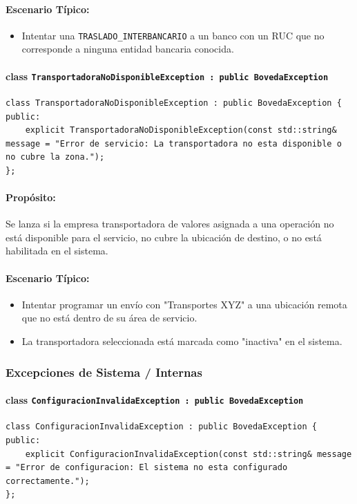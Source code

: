 \documentclass{article}
\newcommand{\inlinecode}[1]{\texttt{#1}}
\begin{document}
\paragraph*{Escenario Típico:}
\begin{itemize}
    \item Intentar una \inlinecode{TRASLADO\_INTERBANCARIO} a un banco con un RUC que no corresponde a ninguna entidad bancaria conocida.
\end{itemize}

\paragraph*{\textbf{class \inlinecode{TransportadoraNoDisponibleException : public BovedaException}}}
\vspace{2mm} %
\begin{lstlisting}
class TransportadoraNoDisponibleException : public BovedaException {
public:
    explicit TransportadoraNoDisponibleException(const std::string& message = "Error de servicio: La transportadora no esta disponible o no cubre la zona.");
};
\end{lstlisting}
\paragraph*{Propósito:} Se lanza si la empresa transportadora de valores asignada a una operaci\'on no est\'a disponible para el servicio, no cubre la ubicaci\'on de destino, o no est\'a habilitada en el sistema.

\paragraph*{Escenario Típico:}
\begin{itemize}
    \item Intentar programar un env\'io con "Transportes XYZ" a una ubicaci\'on remota que no est\'a dentro de su \'area de servicio.
    \item La transportadora seleccionada est\'a marcada como "inactiva" en el sistema.
\end{itemize}

\subsubsection*{Excepciones de Sistema / Internas}

\paragraph*{\textbf{class \inlinecode{ConfiguracionInvalidaException : public BovedaException}}}
\vspace{2mm} %
\begin{lstlisting}
class ConfiguracionInvalidaException : public BovedaException {
public:
    explicit ConfiguracionInvalidaException(const std::string& message = "Error de configuracion: El sistema no esta configurado correctamente.");
};
\end{lstlisting}
\end{document}

